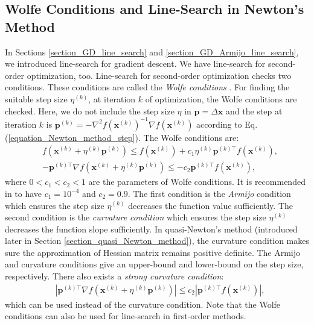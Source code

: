 \documentclass[lang=cn,10pt]{gorgeousnbook}
\numberwithin{equation}{section}%
\numberwithin{figure}{section}%
\begin{document}
\subsection{Wolfe Conditions and Line-Search in Newton's Method}\label{section_Wolfe_conditions}


In Sections \ref{section_GD_line_search} and \ref{section_GD_Armijo_line_search}, we introduced line-search for gradient descent. We have line-search for second-order optimization, too. 
Line-search for second-order optimization checks two conditions. These conditions are called the \textit{Wolfe conditions} \cite{wolfe1969convergence}. 
For finding the suitable step size $\eta^{(k)}$, at iteration $k$ of optimization, the Wolfe conditions are checked.
Here, we do not include the step size $\eta$ in $\boldsymbol{p} = \Delta\boldsymbol{x}$ and the step at iteration $k$ is $\boldsymbol{p}^{(k)} = - \nabla^2 f(\boldsymbol{x}^{(k)})^{-1} \nabla f(\boldsymbol{x}^{(k)})$ according to Eq. (\ref{equation_Newton_method_step}). 
The Wolfe conditions are:
\begin{align}
& f(\boldsymbol{x}^{(k)} + \eta^{(k)} \boldsymbol{p}^{(k)}) \leq f(\boldsymbol{x}^{(k)}) +  c_1 \eta^{(k)} \boldsymbol{p}^{(k)\top} f(\boldsymbol{x}^{(k)}), \\
& -\boldsymbol{p}^{(k)\top} \nabla f(\boldsymbol{x}^{(k)} + \eta^{(k)} \boldsymbol{p}^{(k)}) \leq -c_2 \boldsymbol{p}^{(k)\top} f(\boldsymbol{x}^{(k)}),
\end{align}
where $0 < c_1 < c_2 < 1$ are the parameters of Wolfe conditions. It is recommended in \cite{nocedal2006numerical} to have $c_1 = 10^{-4}$ and $c_2 = 0.9$. 
The first condition is the \textit{Armijo} condition \cite{armijo1966minimization} which ensures the step size $\eta^{(k)}$ decreases the function value sufficiently. The second condition is the \textit{curvature condition} which ensures the step size $\eta^{(k)}$ decreases the function slope sufficiently. 
In quasi-Newton's method (introduced later in Section \ref{section_quasi_Newton_method}), the curvature condition makes sure the approximation of Hessian matrix remains positive definite. 
The Armijo and curvature conditions give an upper-bound and lower-bound on the step size, respectively.
There also exists a \textit{strong curvature condition}:
\begin{align}
& |\boldsymbol{p}^{(k)\top} \nabla f(\boldsymbol{x}^{(k)} + \eta^{(k)} \boldsymbol{p}^{(k)})| \leq c_2 |\boldsymbol{p}^{(k)\top} f(\boldsymbol{x}^{(k)})|,
\end{align}
which can be used instead of the curvature condition.
Note that the Wolfe conditions can also be used for line-search in first-order methods. 
\end{document}
